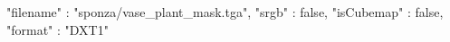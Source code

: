 { 
	"filename" : "sponza/vase_plant_mask.tga", 
	"srgb" : false,
	"isCubemap" : false,
	"format" : "DXT1"
}